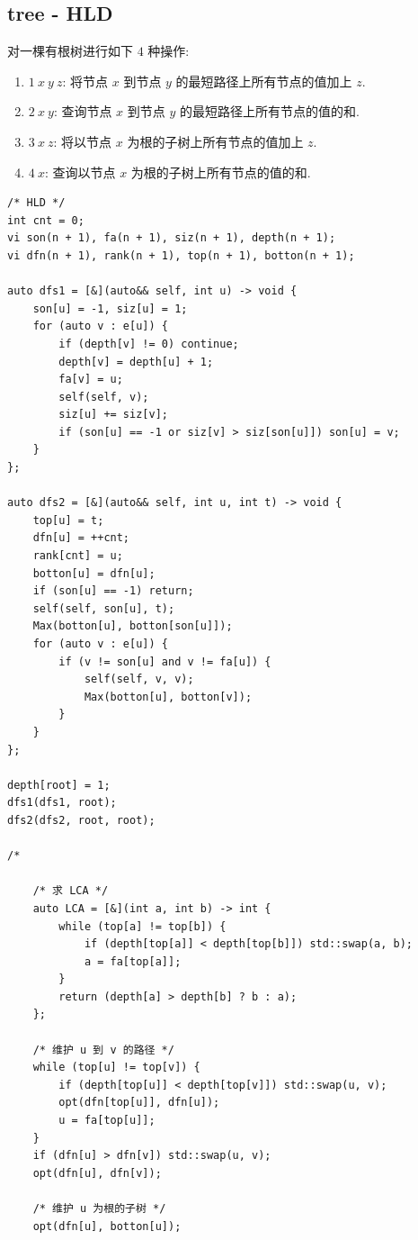 \documentclass[UTF8, a4paper, titlepage, twoside]{ctexart}
\begin{document}
\subsection{ tree - HLD }
对一棵有根树进行如下 \(4\) 种操作:
\begin{enumerate}
	\item \(1 \ x \ y \ z\): 将节点 \(x\) 到节点 \(y\) 的最短路径上所有节点的值加上 \(z\).
	\item \(2 \ x \ y\): 查询节点 \(x\) 到节点 \(y\) 的最短路径上所有节点的值的和.
	\item \(3 \ x \ z\): 将以节点 \(x\) 为根的子树上所有节点的值加上 \(z\).
	\item \(4 \ x\): 查询以节点 \(x\) 为根的子树上所有节点的值的和.
\end{enumerate}

\begin{lstlisting}[style=cpp]
/* HLD */
int cnt = 0;
vi son(n + 1), fa(n + 1), siz(n + 1), depth(n + 1);
vi dfn(n + 1), rank(n + 1), top(n + 1), botton(n + 1);

auto dfs1 = [&](auto&& self, int u) -> void {
    son[u] = -1, siz[u] = 1;
    for (auto v : e[u]) {
        if (depth[v] != 0) continue;
        depth[v] = depth[u] + 1;
        fa[v] = u;
        self(self, v);
        siz[u] += siz[v];
        if (son[u] == -1 or siz[v] > siz[son[u]]) son[u] = v;
    }
};

auto dfs2 = [&](auto&& self, int u, int t) -> void {
    top[u] = t;
    dfn[u] = ++cnt;
    rank[cnt] = u;
    botton[u] = dfn[u];
    if (son[u] == -1) return;
    self(self, son[u], t);
    Max(botton[u], botton[son[u]]);
    for (auto v : e[u]) {
        if (v != son[u] and v != fa[u]) {
            self(self, v, v);
            Max(botton[u], botton[v]);
        }
    }
};

depth[root] = 1;
dfs1(dfs1, root);
dfs2(dfs2, root, root);

/*

    /* 求 LCA */
    auto LCA = [&](int a, int b) -> int {
        while (top[a] != top[b]) {
            if (depth[top[a]] < depth[top[b]]) std::swap(a, b);
            a = fa[top[a]];
        }
        return (depth[a] > depth[b] ? b : a);
    };

    /* 维护 u 到 v 的路径 */
    while (top[u] != top[v]) {
        if (depth[top[u]] < depth[top[v]]) std::swap(u, v);
        opt(dfn[top[u]], dfn[u]);
        u = fa[top[u]];
    }
    if (dfn[u] > dfn[v]) std::swap(u, v);
    opt(dfn[u], dfn[v]);

    /* 维护 u 为根的子树 */
    opt(dfn[u], botton[u]);


\end{lstlisting}
\end{document}
